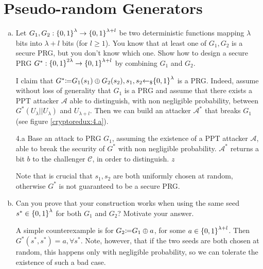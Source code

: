\section{Pseudo-random Generators}
\begin{enumerate}[(a)]
	\item Let $G_1, G_2: {\{0, 1\}}^\lambda \to {\{0, 1\}}^{\lambda + l}$ be two deterministic functions mapping $\lambda$ bits into $\lambda + l$ bits (for $l \ge 1$). You know that at least one of $G_1, G_2$ is a secure PRG, but you don't know which one. Show how to design a secure PRG $G^*:{\{0, 1\}}^{2\lambda} \to {\{0, 1\}}^{\lambda + l}$ by combining $G_1$ and $G_2$.
	
	\begin{solution}	
		I claim that $G^*{\coloneqq} G_1(s_1) \oplus G_2(s_2), s_1, s_2 {\leftarrow_\$} {\{0, 1\}}^\lambda$ is a PRG. Indeed, assume without loss of generality that $G_1$ is a PRG and assume that there exists a PPT attacker $\mathcal{A}$ able to distinguish, with non negligible probability, between $G^*(U_\lambda||U_\lambda)$ and $U_{\lambda + l}$. Then we can build an attacker $\mathcal{A}^*$ that breaks $G_1$ (see figure \ref{cryptoredux:4.a}).
		\begin{cryptoredux}
			{4.a}
			{Base an attack to PRG $G_1$, assuming the existence of a PPT attacker $\mathcal{A}$, able to break the security of $G^*$ with non negligible probability. $\mathcal{A}^*$ returns a bit $b$ to the challenger $\mathcal{C}$, in order to distinguish.}
			{}
			{}
			{}
			{$z$}{}
			\cseqdelay			
			\cseqdelay
		\end{cryptoredux}
	
		Note that is crucial that $s_1, s_2$ are both uniformly chosen at random, otherwise $G^*$ is not guaranteed to be a secure PRG.
	\end{solution}

	\item Can you prove that your construction works when using the same seed $s^* \in {\{0, 1\}}^\lambda$ for both $G_1$ and $G_2$? Motivate your answer.

	\begin{solution}
		A simple counterexample is for $G_2{\coloneqq} G_1 \oplus a$, for some $a \in {\{0, 1\}}^{\lambda + l}$. Then $G^*(s^*, s^*) = a, \forall s^*$. Note, however, that if the two seeds are both chosen at random, this happens only with negligible probability, so we can tolerate the existence of such a bad case.
	\end{solution}
\end{enumerate}